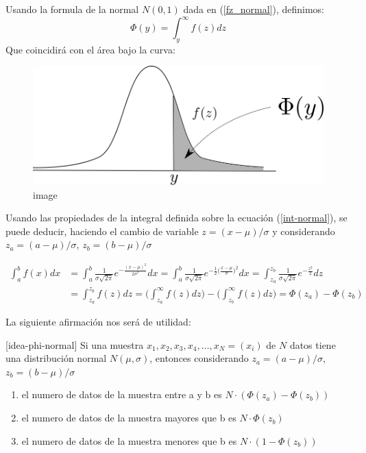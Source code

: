 Usando la formula de la normal \(N(0,1)\) dada en
(\protect\hyperlink{fz_normal}{{[}fz\_normal{]}}), definimos:
\[\Phi(y) = \int^{\infty}_{y} f(z)dz\] Que coincidirá con el área bajo
la curva:

\begin{figure}
\centering
\includegraphics{drawing_phi.png}
\caption{image}
\end{figure}

Usando las propiedades de la integral definida sobre la ecuación
(\protect\hyperlink{int-normal}{{[}int-normal{]}}), se puede deducir,
haciendo el cambio de variable \(z=(x-\mu)/\sigma\) y considerando
\(z_a=(a-\mu)/\sigma\), \(z_b=(b-\mu)/\sigma\)

\[\begin{aligned}
    \label{int-normal2}
    \int^b_a f(x) dx &= \int^b_a \frac{1}{\sigma \sqrt{2\pi}} e^{-\frac{(x-\mu)^2}{2\sigma^2}} dx
    = \int^{b}_{a} \frac{1}{\sigma \sqrt{2\pi}} e^{-\frac{1}{2}\big(\frac{x-\mu}{\sigma}\big)^2} dx
    = \int^{z_b}_{z_a} \frac{1}{\sigma \sqrt{2\pi}} e^{-\frac{z^2}{2}} dz\\ 
    &= \int^{z_b}_{z_a} f(z) dz = \bigg(\int^{\infty}_{z_a} f(z) dz\bigg) - \bigg(\int^{\infty}_{z_b} f(z) dz\bigg)  = \Phi(z_a) - \Phi(z_b)\end{aligned}\]

La siguiente afirmación nos será de utilidad:

\protect\hypertarget{idea-phi-normal}{}{{[}idea-phi-normal{]}} Si una
muestra \(x_1, x_2, x_3, x_4, \ldots, x_N = (x_i)\) de \(N\) datos tiene
una distribución normal \(N(\mu, \sigma)\), entonces considerando
\(z_a=(a-\mu)/\sigma\), \(z_b=(b-\mu)/\sigma\)

\begin{enumerate}
\def\labelenumi{\arabic{enumi}.}
\item
  el numero de datos de la muestra entre a y b es
  \(N \cdot (\Phi(z_a) - \Phi(z_b))\)
\item
  el numero de datos de la muestra mayores que b es
  \(N \cdot \Phi(z_b)\)
\item
  el numero de datos de la muestra menores que b es
  \(N \cdot (1 - \Phi(z_b))\)
\end{enumerate}

